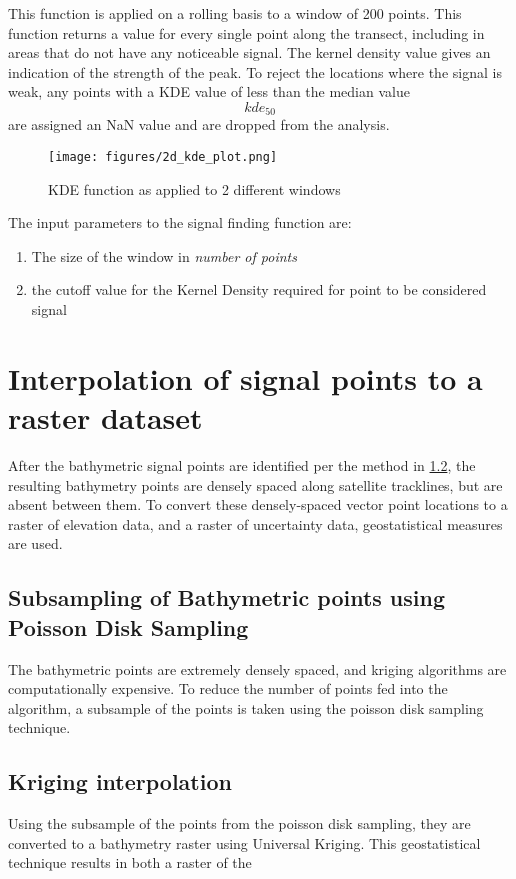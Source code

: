 This function is applied on a rolling basis to a window of 200 points. This function returns a value for every single point along the transect, including in areas that do not have any noticeable signal. The kernel density value gives an indication of the strength of the peak. To reject the locations where the signal is weak, any points with a KDE value of less than the median value $$ kde_{50} $$  are assigned an NaN value and are dropped from the analysis.

\begin{figure}[htbp]
    \centering
    \texttt{[image: figures/2d\_kde\_plot.png]}
    \caption{KDE function as applied to 2 different windows}
    \label{fig:kdefunc}
\end{figure}

The input parameters to the signal finding function are:

\begin{enumerate}
    \item The size of the window in \emph{number of points}
    \item the cutoff value for the Kernel Density required for point to be considered signal
\end{enumerate}

\section{Interpolation of signal points to a raster dataset}

After the bathymetric signal points are identified per the method in \ref{}, the resulting bathymetry points are densely spaced along satellite tracklines, but are absent between them. To convert these densely-spaced vector point locations to a raster of elevation data, and a raster of uncertainty data, geostatistical measures are used.

\subsection{Subsampling of Bathymetric points using Poisson Disk Sampling} \label{subsec:poissonsubsampling}
The bathymetric points are extremely densely spaced, and kriging algorithms are computationally expensive. To reduce the number of points fed into the algorithm, a subsample of the points is taken using the poisson disk sampling technique. 

\subsection{Kriging interpolation}
Using the subsample of the points from the poisson disk sampling, they are converted to a bathymetry raster using Universal Kriging. This geostatistical technique results in both a raster of the 


